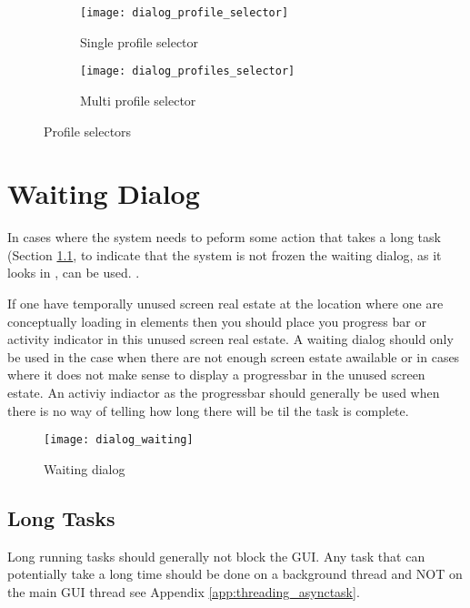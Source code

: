 \begin{figure}[!htbp]
    \centering
    \begin{subfigure}[t]{0.4\textwidth}
    	\centering
        \texttt{[image: dialog\_profile\_selector]}
        \caption{Single profile selector}
        \label{fig:profile_selector_dialog}
    \end{subfigure}
    \hspace{5em}
    \begin{subfigure}[t]{0.4\textwidth}
    	\centering
        \texttt{[image: dialog\_profiles\_selector]}
        \caption{Multi profile selector}
        \label{fig:profiles_selector_dialog}
    \end{subfigure}
    
    \caption{Profile selectors}
    \label{fig:profile_selection}
\end{figure}

\section{Waiting Dialog}
\label{sec:waiting_dialog}

In cases where the system needs to peform some action that takes a long task (Section \ref{sub:long_tasks}, to indicate that the system is not frozen the waiting dialog, as it looks in , can be used. .

\begin{note}
	If one have temporally unused screen real estate at the location where one are conceptually loading in elements then you should place you progress bar or activity indicator in this unused screen real estate. A waiting dialog should only be used in the case when there are not enough screen estate awailable or in cases where it does not make sense to display a progressbar in the unused screen estate. An activiy indiactor as the progressbar should generally be used when there is no way of telling how long there will be til the task is complete. 
\end{note}


\begin{figure}[h]
	\centering
	\texttt{[image: dialog\_waiting]}
	\caption{Waiting dialog}
	\label{fig:dialog_waiting}
\end{figure}
\FloatBarrier

\subsection{Long Tasks}
\label{sub:long_tasks}
Long running tasks should generally not block the GUI. Any task that can potentially take a long time should be done on a background thread and NOT on the main GUI thread see Appendix \ref{app:threading_asynctask}. 

